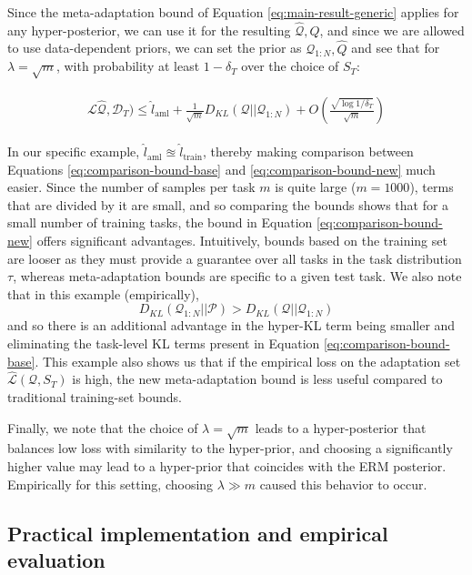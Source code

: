 \documentclass{article}
\theoremstyle{definition}
\begin{document}
Since the meta-adaptation bound of Equation \ref{eq:main-result-generic} applies for any hyper-posterior, we can use it for the resulting $\hat{\mathcal{Q}},\hat{Q}$, and since we are allowed to use data-dependent priors, we can set the prior as $\mathcal{Q}_{1:N},\hat{Q}$ and see that
	for $\lambda=\sqrt{m}$, with probability at least $1-\delta_T$ over the choice of $S_T$:

\begin{align} \label{eq:comparison-bound-new}
\begin{split}
\mathcal{L}\hat{\mathcal{Q}},\mathcal{D}_T)\leq \hat{l}_{\mathrm{aml}} + \frac{1}{\sqrt{m}}D_{KL}(\mathcal{Q}||\mathcal{Q}_{1:N}) + O\left (\frac{\sqrt{\log{1/\delta_T}}}{\sqrt{m}}\right ) 
\end{split}
\end{align}

In our specific example, $\hat{l}_{\mathrm{aml}}\approxeq \hat{l}_{\mathrm{train}}$, thereby making comparison between Equations \ref{eq:comparison-bound-base} and \ref{eq:comparison-bound-new} much easier. Since the number of samples per task $m$ is quite large ($m=1000$), terms that are divided by it are small, and so comparing the bounds shows that for a small number of training tasks, the bound in Equation \ref{eq:comparison-bound-new} offers significant advantages. Intuitively, bounds based on the training set are looser as they must provide a guarantee over all tasks in the task distribution $\tau$, whereas meta-adaptation bounds are specific to a given test task. We also note that in this example (empirically),  $$D_{KL}(\mathcal{Q}_{1:N}||\mathcal{P})>D_{KL}(\mathcal{Q}||\mathcal{Q}_{1:N})$$ 
	and so there is an additional advantage in the hyper-KL term being smaller and eliminating the task-level KL terms present in Equation \ref{eq:comparison-bound-base}. This example also shows us that if the empirical loss on the adaptation set $\hat{\mathcal{L}}(\mathcal{Q}, S_T)$ is high, the new meta-adaptation bound is less useful compared to traditional training-set bounds. 


Finally, we note that the choice of $\lambda=\sqrt{m}$ leads to a hyper-posterior that balances low loss with similarity to the hyper-prior, and choosing a significantly higher value may lead to a hyper-prior that coincides with the ERM posterior. Empirically for this setting, choosing $\lambda\gg m$ caused this behavior to occur.

\subsection{Practical implementation and empirical evaluation}
\end{document}
